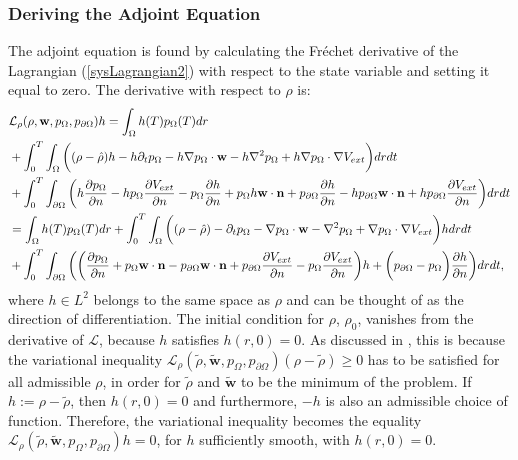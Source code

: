 \subsubsection{Deriving the Adjoint Equation} \label{secOptimalityAdjoint1}
The adjoint equation is found by calculating the Fr\'echet derivative of the Lagrangian (\ref{sysLagrangian2}) with respect to the state variable and setting it equal to zero.
The derivative with respect to $\rho$ is:
\begin{align*}
&\mathcal{L}_\rho (\rho,\mathbf{w}, p_\Omega, p_{\partial \Omega}) h =\int_\Omega h(T) p_\Omega(T) dr\\
&+ \int_0^T\int_\Omega  \bigg( (\rho- \hat{\rho})h   - h\partial_t  p_\Omega  - h\nabla p_\Omega \cdot  \mathbf{w} - h \nabla^2 p_\Omega \notag 
 +  h \nabla p_\Omega\cdot \nabla V_{ext} \bigg)dr dt  \\
& + \int_0^T  \int_{\partial \Omega}  \bigg(h \frac{\partial p_\Omega }{\partial n}  -  h p_\Omega \frac{\partial V_{ext}}{\partial n} 
- p_\Omega \frac{\partial h}{\partial n} 
+ p_\Omega h \mathbf{w} \cdot \mathbf{n} \notag 
+ p_{\partial \Omega} \dfrac{\partial h}{\partial n} - h p_{\partial \Omega} \mathbf{w} \cdot \mathbf{n} + h p_{\partial \Omega} \dfrac{\partial V_{ext}}{\partial n}  \bigg) dr dt  \notag\\
&=\int_\Omega h(T) p_\Omega(T) dr + \int_0^T\int_\Omega  \bigg( (\rho- \hat{\rho})   - \partial_t  p_\Omega  - \nabla p_\Omega \cdot \mathbf{w}  - \nabla^2 p_\Omega \notag 
 +  \nabla p_\Omega\cdot \nabla V_{ext} \bigg)h dr dt \\
& + \int_0^T\int_{\partial \Omega}   \bigg(
\bigg(\frac{\partial p_\Omega }{\partial n} + p_\Omega  \mathbf{w} \cdot \mathbf{n} - p_{\partial \Omega} \mathbf{w} \cdot \mathbf{n} +  p_{\partial \Omega} \dfrac{\partial V_{ext}}{\partial n} - p_\Omega \frac{\partial V_{ext}}{\partial n} \bigg)h
+ \bigg( p_{\partial \Omega}- p_\Omega \bigg) \frac{\partial h}{\partial n} \bigg) dr dt \notag,
\end{align*}
where $h \in L^2$ belongs to the same space as $\rho$ and can be thought of as the direction of differentiation.
The initial condition for $\rho$, $\rho_0$, vanishes from the derivative of $\mathcal{L}$, because $h$ satisfies $h(r,0)=0$. As discussed in \cite{TroeltzschFredi2010OCoP}, this is because the variational inequality $\mathcal{L}_\rho(\tilde \rho, \mathbf{\tilde w},p_\Omega, p_{\partial\Omega})(\rho -\tilde\rho)\geq 0$ has to be satisfied for all admissible $\rho$, in order for $\tilde \rho$ and $\mathbf{\tilde w}$ to be the minimum of the problem.
If $h:=\rho-\tilde \rho$, then $h(r,0)=0$ and furthermore, $-h$ is also an admissible choice of function. Therefore, the variational inequality becomes the equality $\mathcal{L}_\rho(\tilde \rho,\mathbf{\tilde w},p_\Omega, p_{\partial\Omega})h= 0$, for $h$ sufficiently smooth, with $h(r,0)=0$. 

